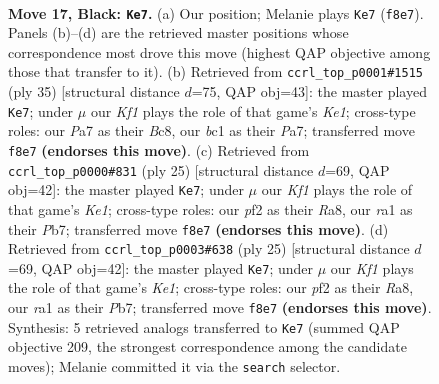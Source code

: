 \documentclass[11pt]{article}
\begin{document}
\begin{figure}[p]
\label{fig:thought-m31}
\end{figure}

\clearpage

\begin{figure}[p]\centering
\begin{subfigure}{0.46\textwidth}\centering
\resizebox{\linewidth}{!}{%
\newchessgame
\chessboard[
  setfen={rn1r1k1b/p4p1p/P1p2np1/4p3/4P2P/2N2B2/2P2P2/R1B2RK1 b - - 0 17},
  showmover=false,
  pgfstyle=straightmove, color=movearrow, markmove={f8-e7}
]}
\caption{}
\end{subfigure}\hfill
\begin{subfigure}{0.46\textwidth}\centering
\resizebox{\linewidth}{!}{%
\newchessgame
\chessboard[
  setfen={r1b1k2r/p4p1p/1pp2pp1/8/P2PNn2/5P2/1PP3PP/2KR1B1R b kq - 1 18},
  showmover=false,
  pgfstyle=straightmove, color=movearrow, markmove={e8-e7}
]}
\caption{}
\end{subfigure}
\\[4pt]
\begin{subfigure}{0.46\textwidth}\centering
\resizebox{\linewidth}{!}{%
\newchessgame
\chessboard[
  setfen={r1b1k2r/pp1n1ppp/4p3/3pP3/3N1P2/8/PPP3PP/R3KB1R b KQkq - 0 13},
  showmover=false,
  pgfstyle=straightmove, color=movearrow, markmove={e8-e7}
]}
\caption{}
\end{subfigure}\hfill
\begin{subfigure}{0.46\textwidth}\centering
\resizebox{\linewidth}{!}{%
\newchessgame
\chessboard[
  setfen={r1b1k2r/pp1n1ppp/4p3/3pP3/3N1P2/8/PPP3PP/R3KB1R b KQkq - 0 13},
  showmover=false,
  pgfstyle=straightmove, color=movearrow, markmove={e8-e7}
]}
\caption{}
\end{subfigure}
\caption{\textbf{Move 17, Black: \texttt{Ke7}.} (a) Our position; Melanie plays \texttt{Ke7} (\texttt{f8e7}). Panels (b)--(d) are the retrieved master positions whose correspondence most drove this move (highest QAP objective among those that transfer to it). (b) Retrieved from \texttt{ccrl\_top\_p0001\#1515} (ply 35) [structural distance $d$=75, QAP obj=43]: the master played \texttt{Ke7}; under $\mu$ our \emph{Kf1} plays the role of that game's \emph{Ke1}; cross-type roles: our \emph{P}a7 as their \emph{B}c8, our \emph{b}c1 as their \emph{P}a7; transferred move \texttt{f8e7} \textbf{(endorses this move)}. (c) Retrieved from \texttt{ccrl\_top\_p0000\#831} (ply 25) [structural distance $d$=69, QAP obj=42]: the master played \texttt{Ke7}; under $\mu$ our \emph{Kf1} plays the role of that game's \emph{Ke1}; cross-type roles: our \emph{p}f2 as their \emph{R}a8, our \emph{r}a1 as their \emph{P}b7; transferred move \texttt{f8e7} \textbf{(endorses this move)}. (d) Retrieved from \texttt{ccrl\_top\_p0003\#638} (ply 25) [structural distance $d$=69, QAP obj=42]: the master played \texttt{Ke7}; under $\mu$ our \emph{Kf1} plays the role of that game's \emph{Ke1}; cross-type roles: our \emph{p}f2 as their \emph{R}a8, our \emph{r}a1 as their \emph{P}b7; transferred move \texttt{f8e7} \textbf{(endorses this move)}. Synthesis: 5 retrieved analogs transferred to \texttt{Ke7} (summed QAP objective 209, the strongest correspondence among the candidate moves); Melanie committed it via the \texttt{search} selector.}
\label{fig:thought-m33}
\end{figure}
\end{document}
